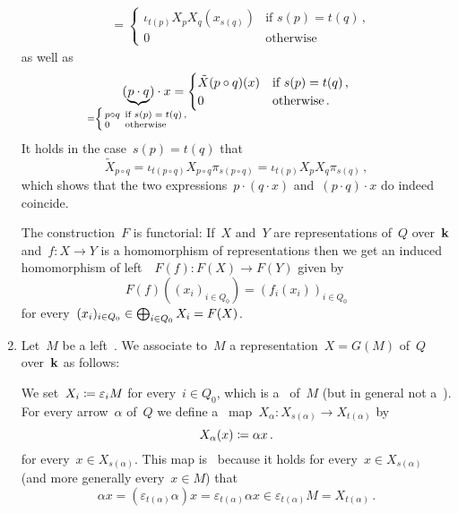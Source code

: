 \begin{remark}
\begin{enumerate}
\begin{align*}
        \\
        &= \begin{cases}
            \iota_{t(p)} X_p X_q(x_{s(q)})  & \text{if~$s(p) = t(q)$} \,, \\
            0                               & \text{otherwise}
          \end{cases}
      \end{align*}
      as well as
      \[
          (
          \underbrace{ p \cdot q }_{\mathclap{
              = \left\{
                  \begingroup
                  \renewcommand{\thickspace}{\kern 0.4em} %
                  \begin{smallmatrix*}[l]
                    p \circ q & \text{if~$s(p) = t(q)$} \,, \\
                    0         & \text{otherwise}
                  \end{smallmatrix*}
                  \endgroup
                \right.
            }}
            )
            \cdot x
        =   \begin{cases}
              \tilde{X}{(p \circ q)}(x) & \text{if~$s(p) = t(q)$} \,, \\
              0                         & \text{otherwise}  \,.
            \end{cases}
      \]
      It holds in the case~$s(p) = t(q)$ that
      \[
          \tilde{X}_{p \circ q}
        = \iota_{t(p \circ q)} X_{p \circ q} \pi_{s(p \circ q)}
        = \iota_{t(p)} X_p X_q \pi_{s(q)} \,,
      \]
      which shows that the two expressions~$p \cdot (q \cdot x)$ and~$(p \cdot q) \cdot x$ do indeed coincide.
      
      The construction~$F$ is functorial:
      If~$X$ and~$Y$ are representations of~$Q$ over~$\kf$ and~$f \colon X \to Y$ is a homomorphism of representations then we get an induced homomorphism of left~{}~$F(f) \colon F(X) \to F(Y)$ given by
      \[
          F(f)\left( (x_i)_{i \in Q_0} \right)
        = ( f_i(x_i) )_{i \in Q_0}
      \]
      for every~$(x_i)_{i \in Q_0} \in \bigoplus_{i \in Q_0} X_i = F(X)$.
      
    \item
      Let~$M$ be a left~{}.
      We associate to~$M$ a representation~$X = G(M)$ of~$Q$ over~$\kf$ as follows:
      
      We set~$X_i \coloneqq \varepsilon_i M$ for every~$i \in Q_0$, which is a~{\submodule{$\kf$}} of~$M$ (but in general not a~{}).
      For every arrow~$\alpha$ of~$Q$ we define a~{\klin} map~$X_\alpha \colon X_{s(\alpha)} \to X_{t(\alpha)}$ by
      \[
                  X_\alpha( x )
        \coloneqq  \alpha x \,.
      \]
      for every~$x \in X_{s(\alpha)}$.
      This map is~{\welldef} because it holds for every~$x \in X_{s(\alpha)}$ (and more generally every~$x \in M$) that
      \[
            \alpha x
        =   (\varepsilon_{t(\alpha)} \alpha) x
        =   \varepsilon_{t(\alpha)} \alpha x
        \in \varepsilon_{t(\alpha)} M
        =   X_{t(\alpha)} \,.
      \]
      

\end{enumerate}
\end{remark}
